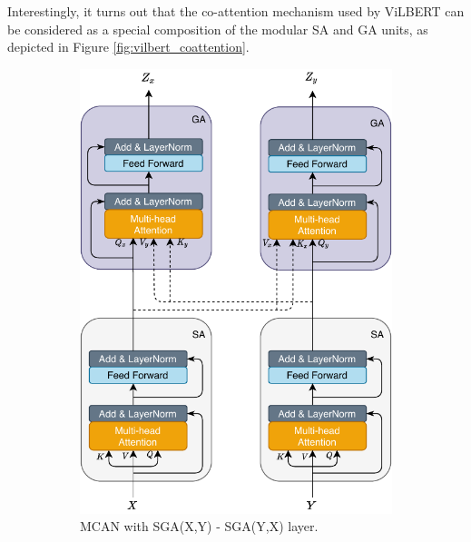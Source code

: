 \documentclass{article}
\begin{document}
Interestingly, it turns out that the co-attention mechanism used by ViLBERT can be considered as a special composition of the modular SA and GA units, as depicted in Figure \ref{fig:vilbert_coattention}.

\begin{figure}[ht]
	\centering
	\begin{subfigure}[b]{\textwidth}
	\centering
	\includegraphics[scale=0.7]{attention}
	\caption{MCAN with SGA(X,Y) - SGA(Y,X) layer.}
	\end{subfigure}
	\begin{subfigure}[b]{\textwidth}
	\centering

\end{subfigure}
\end{figure}
\end{document}
